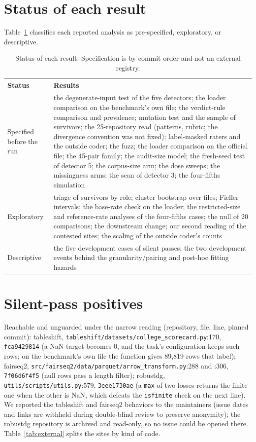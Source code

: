 \documentclass[10pt]{article}
\theoremstyle{definition}
\begin{document}
\section{Status of each result}
\label{apd:status}
Table~\ref{tab:status} classifies each reported analysis as pre-specified, exploratory, or descriptive.
\begin{table}[h]
\centering\footnotesize
\begin{tabular}{@{}p{5.2cm}p{7.6cm}@{}}
\toprule
Status & Results\\
\midrule
Specified before the run & the degenerate-input test of the five detectors; the loader comparison on the benchmark's own file; the verdict-rule comparison and prevalence; mutation test and the sample of survivors; the 25-repository read (patterns, rubric; the divergence convention was not fixed); label-masked raters and the outside coder; the fuzz; the loader comparison on the official file; the 45-pair family; the audit-size model; the fresh-seed test of detector 5; the corpus-size arm; the dose sweeps; the missingness arms; the scan of detector 3; the four-fifths simulation\\
Exploratory & triage of survivors by role; cluster bootstrap over files; Fieller intervals; the base-rate check on the loader; the restricted-size and reference-rate analyses of the four-fifths cases; the null of 20 comparisons; the downstream change; our second reading of the contested sites; the scaling of the outside coder's counts\\
Descriptive & the five development cases of silent passes; the two development events behind the granularity/pairing and post-hoc fitting hazards\\
\bottomrule
\end{tabular}
\caption{Status of each result. Specification is by commit order and not an external registry.}
\label{tab:status}
\end{table}
\FloatBarrier

\section{Silent-pass positives}
\label{apd:positives}
Reachable and unguarded under the narrow reading (repository, file, line, pinned commit): tableshift, \texttt{tableshift/datasets/college\_scorecard.py}:170, \texttt{fca9429814} (a NaN target becomes 0, and the task's configuration keeps such rows; on the benchmark's own file the function gives 89,819 rows that label); fairseq2, \texttt{src/fairseq2/data/parquet/arrow\_transform.py}:288 and :306, \texttt{7f06d6f4f5} (null rows pass a length filter); robustdg, \texttt{utils/scripts/utils.py}:579, \texttt{3eee1730ae} (a \texttt{max} of two losses returns the finite one when the other is NaN, which defeats the \texttt{isfinite} check on the next line). We reported the tableshift and fairseq2 behaviors to the maintainers (issue dates and links are withheld during double-blind review to preserve anonymity); the robustdg repository is archived and read-only, so no issue could be opened there. Table~\ref{tab:external} splits the sites by kind of code.
\end{document}
